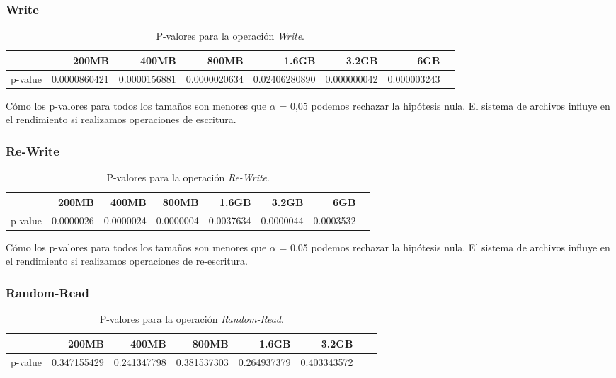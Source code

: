 \subsubsection{Write}
\begin{table}[!htp]\centering
\scriptsize
\begin{tabular}{lrrrrrrr}\toprule
&200MB &400MB &800MB &1.6GB &3.2GB &6GB \\\midrule
p-value &0.0000860421 &0.0000156881 &0.0000020634 &0.02406280890 &0.000000042 &0.000003243 \\
\bottomrule
\end{tabular}
\caption{P-valores para la operación \textit{Write}.}\label{tab: }
\end{table}

Cómo los p-valores para todos los tamaños son menores que $\alpha$ = 0,05 podemos rechazar la hipótesis nula. El sistema de archivos influye en el rendimiento si realizamos operaciones de escritura. 

\subsubsection{Re-Write}
\begin{table}[!htp]\centering
\scriptsize
\begin{tabular}{lrrrrrrr}\toprule
&200MB &400MB &800MB &1.6GB &3.2GB &6GB \\\midrule
p-value &0.0000026 &0.0000024 &0.0000004 &0.0037634 &0.0000044 &0.0003532 \\
\bottomrule
\end{tabular}
\caption{P-valores para la operación \textit{Re-Write}.}\label{tab: }
\end{table}

Cómo los p-valores para todos los tamaños son menores que $\alpha$ = 0,05 podemos rechazar la hipótesis nula. El sistema de archivos influye en el rendimiento si realizamos operaciones de re-escritura. 

\subsubsection{Random-Read}
\begin{table}[!htp]\centering
\scriptsize
\begin{tabular}{lrrrrrrr}\toprule
&200MB &400MB &800MB &1.6GB &3.2GB \\\midrule
p-value &0.347155429 &0.241347798 &0.381537303 &0.264937379 &0.403343572 \\
\bottomrule
\end{tabular}
\caption{P-valores para la operación \textit{Random-Read}.}\label{tab: }
\end{table}

